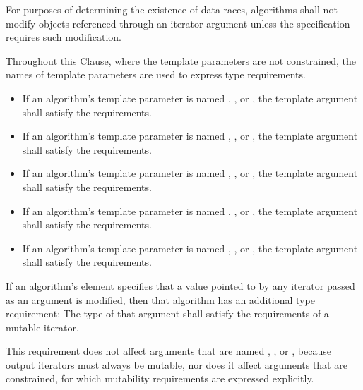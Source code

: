 \pnum
For purposes of determining the existence of data races,
algorithms shall not modify objects referenced through an iterator argument
unless the specification requires such modification.

\pnum
Throughout this Clause, where the template parameters are not constrained,
the names of template parameters are used to express type requirements.
\begin{itemize}
\item
  If an algorithm's template parameter is named
  ,
  , or
  ,
  the template argument shall satisfy the
   requirements.
\item
  If an algorithm's template parameter is named
  ,
  , or
  ,
  the template argument shall satisfy the
   requirements.
\item
  If an algorithm's template parameter is named
  ,
  , or
  ,
  the template argument shall satisfy the
   requirements.
\item
  If an algorithm's template parameter is named
  ,
  , or
  ,
  the template argument shall satisfy the
   requirements.
\item
  If an algorithm's template parameter is named
  ,
  , or
  ,
  the template argument shall satisfy the
   requirements.
\end{itemize}

\pnum
If an algorithm's \effects element specifies
that a value pointed to by any iterator passed as an argument is modified,
then that algorithm has an additional type requirement:
The type of that argument shall satisfy
the requirements of a mutable iterator.
\begin{note}
This requirement does not affect arguments that are named
, , or ,
because output iterators must always be mutable, nor
does it affect arguments that are constrained,
for which mutability requirements are expressed explicitly.
\end{note}

